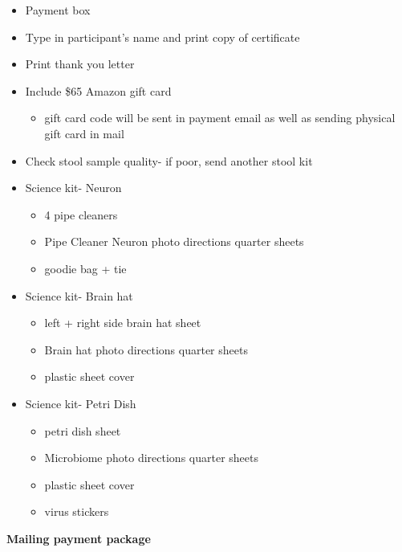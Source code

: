 \documentclass[]{book}
\providecommand{\tightlist}{%
  \setlength{\itemsep}{0pt}\setlength{\parskip}{0pt}}
\begin{document}
\begin{itemize}
\tightlist
\item
  Payment box
\item
  Type in participant's name and print copy of certificate
\item
  Print thank you letter
\item
  Include \$65 Amazon gift card

  \begin{itemize}
  \tightlist
  \item
    gift card code will be sent in payment email as well as sending physical gift card in mail
  \end{itemize}
\item
  Check stool sample quality- if poor, send another stool kit
\item
  Science kit- Neuron

  \begin{itemize}
  \tightlist
  \item
    4 pipe cleaners
  \item
    Pipe Cleaner Neuron photo directions quarter sheets
  \item
    goodie bag + tie
  \end{itemize}
\item
  Science kit- Brain hat

  \begin{itemize}
  \tightlist
  \item
    left + right side brain hat sheet
  \item
    Brain hat photo directions quarter sheets
  \item
    plastic sheet cover
  \end{itemize}
\item
  Science kit- Petri Dish

  \begin{itemize}
  \tightlist
  \item
    petri dish sheet
  \item
    Microbiome photo directions quarter sheets
  \item
    plastic sheet cover
  \item
    virus stickers
  \end{itemize}
\end{itemize}

\textbf{Mailing payment package}
\end{document}
